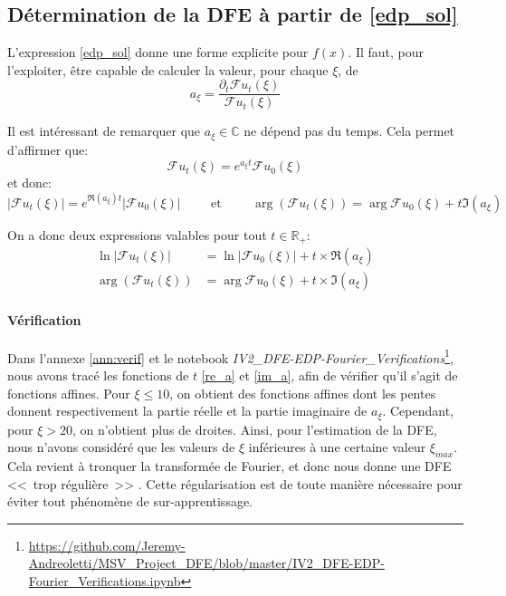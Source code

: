 \documentclass[12pt]{article}
\newcommand{\pth}[1]{\left(#1\right)}
\newcommand{\cro}[1]{\left[#1\right]}
\newcommand{\abs}[1]{\left|#1\right|}
\newcommand{\et}{\hspace{1cm}\text{et}\hspace{1cm}}
\newcommand{\ou}{\hspace{1cm}\text{ou}\hspace{1cm}}
\newcommand{\Ce}{\mathbb{C}}
\newcommand{\Er}{\mathbb{R}}
\newcommand{\Esp}[1]{\mathbb{E}\cro{#1}}
\newcommand{\dr}{\partial}
\newcommand{\fr}{\mathcal{F}}
\begin{document}
%
%
%


\subsection{Détermination de la DFE à partir de \eqref{edp_sol}\label{ss:det_dfe}}

L'expression \eqref{edp_sol} donne une forme explicite pour $f(x)$. Il faut, pour l'exploiter, être capable de calculer la valeur, pour chaque $\xi$, de
\[a_{\xi}=\frac{\dr_t\fr u_t(\xi)}{\fr u_t(\xi)}\]

Il est intéressant de remarquer que $a_{\xi}\in\Ce$ ne dépend pas du temps. Cela permet d'affirmer que:
\[\fr u_t(\xi)=e^{a_{\xi}t}\fr u_0(\xi)\] et donc:
\[\abs{\fr u_t(\xi)}=e^{\Re(a_{\xi})t}\abs{\fr u_0(\xi)} \et \arg\pth{\fr u_t(\xi)}=\arg{\fr u_0(\xi)}+t\Im(a_{\xi})\]

On a donc deux expressions valables pour tout $t\in \Er_+$:
\begin{align}
  \ln\abs{\fr u_t(\xi)}&=\ln\abs{\fr u_0(\xi)}+t\times\Re(a_{\xi})\label{re_a}\\
  \arg\pth{\fr u_t(\xi)}&=\arg{\fr u_0(\xi)}+t\times\Im(a_{\xi})\label{im_a}
\end{align}

\paragraph{Vérification} Dans l'annexe \ref{ann:verif} et le notebook \emph{IV2\_DFE-EDP-Fourier\_Verifications}\footnote{\url{https://github.com/Jeremy-Andreoletti/MSV_Project_DFE/blob/master/IV2_DFE-EDP-Fourier_Verifications.ipynb}}, nous avons tracé les fonctions de $t$ \eqref{re_a} et \eqref{im_a}, afin de vérifier qu'il s'agit de fonctions affines. Pour $\xi\leqslant 10$, on obtient des fonctions affines dont les pentes donnent respectivement la partie réelle et la partie imaginaire de $a_{\xi}$. Cependant, pour $\xi>20$, on n'obtient plus de droites. Ainsi, pour l'estimation de la DFE, nous n'avons considéré que les valeurs de $\xi$ inférieures à une certaine valeur $\xi_{max}$. Cela revient à tronquer la transformée de Fourier, et donc nous donne une DFE <<~trop régulière~>> . Cette régularisation est de toute manière nécessaire pour éviter tout phénomène de sur-apprentissage.
\end{document}
